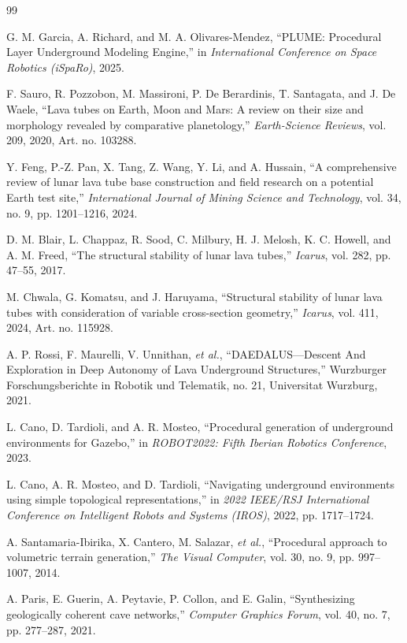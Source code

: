 \documentclass[conference]{IEEEtran}
\begin{document}
\begin{thebibliography}{99}

G. M. Garcia, A. Richard, and M. A. Olivares-Mendez,
``PLUME: Procedural Layer Underground Modeling Engine,''
in \emph{International Conference on Space Robotics (iSpaRo)}, 2025.

F. Sauro, R. Pozzobon, M. Massironi, P. De Berardinis, T. Santagata, and J. De Waele,
``Lava tubes on Earth, Moon and Mars: A review on their size and morphology revealed by comparative planetology,''
\emph{Earth-Science Reviews}, vol. 209, 2020, Art. no. 103288.

Y. Feng, P.-Z. Pan, X. Tang, Z. Wang, Y. Li, and A. Hussain,
``A comprehensive review of lunar lava tube base construction and field research on a potential Earth test site,''
\emph{International Journal of Mining Science and Technology}, vol. 34, no. 9, pp. 1201--1216, 2024.

D. M. Blair, L. Chappaz, R. Sood, C. Milbury, H. J. Melosh, K. C. Howell, and A. M. Freed,
``The structural stability of lunar lava tubes,''
\emph{Icarus}, vol. 282, pp. 47--55, 2017.

M. Chwala, G. Komatsu, and J. Haruyama,
``Structural stability of lunar lava tubes with consideration of variable cross-section geometry,''
\emph{Icarus}, vol. 411, 2024, Art. no. 115928.

A. P. Rossi, F. Maurelli, V. Unnithan, \emph{et al.},
``DAEDALUS---Descent And Exploration in Deep Autonomy of Lava Underground Structures,''
Wurzburger Forschungsberichte in Robotik und Telematik, no. 21, Universitat Wurzburg, 2021.

L. Cano, D. Tardioli, and A. R. Mosteo,
``Procedural generation of underground environments for Gazebo,''
in \emph{ROBOT2022: Fifth Iberian Robotics Conference}, 2023.

L. Cano, A. R. Mosteo, and D. Tardioli,
``Navigating underground environments using simple topological representations,''
in \emph{2022 IEEE/RSJ International Conference on Intelligent Robots and Systems (IROS)}, 2022, pp. 1717--1724.

A. Santamaria-Ibirika, X. Cantero, M. Salazar, \emph{et al.},
``Procedural approach to volumetric terrain generation,''
\emph{The Visual Computer}, vol. 30, no. 9, pp. 997--1007, 2014.

A. Paris, E. Guerin, A. Peytavie, P. Collon, and E. Galin,
``Synthesizing geologically coherent cave networks,''
\emph{Computer Graphics Forum}, vol. 40, no. 7, pp. 277--287, 2021.


\end{thebibliography}
\end{document}

